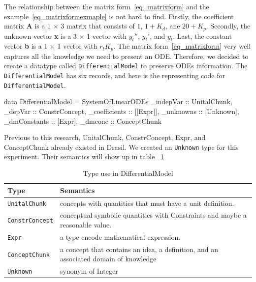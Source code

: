 The relationship between the matrix form~\ref{eq_matrixform} and the example~\ref{eq_matrixformexmaple} is not hard to find. Firstly, the coefficient matrix \textbf{A} is a 1 $\times$ 3 matrix that consists of $1$, $1 + K_d$, ane $20 + K_p$. Secondly, the unknown vector \textbf{x} is a 3 $\times$ 1 vector with $y_t''$, $y_t'$, and $y_t$. Last, the constant vector \textbf{b} is a 1 $\times$ 1 vector with $r_t K_p$. The matrix form~\ref{eq_matrixform} very well captures all the knowledge we need to present an ODE. Therefore, we decided to create a datatype called \verb|DifferentialModel| to preserve ODEs information. The \verb|DifferentialModel| has six records, and here is the representing code for \verb|DifferentialModel|.
\begin{haskell1}
data DifferentialModel = SystemOfLinearODEs {
	_indepVar :: UnitalChunk,
	_depVar :: ConstrConcept,
	_coefficients :: [[Expr]],
	_unknowns :: [Unknown],
	_dmConstants :: [Expr],
	_dmconc :: ConceptChunk
}
\end{haskell1}

Previous to this research, UnitalChunk, ConstrConcept, Expr, and ConceptChunk already existed in Drasil. We created an \verb|Unknown| type for this experiment. Their semantics will show up in table ~\ref{tab_demodeltype}

\begin{table}[ht]
	\begin{tabular}{ p{} p{} }
		\textbf{Type} & \textbf{Semantics} \\
		\toprule
		\verb|UnitalChunk| & concepts with quantities that must have a unit definition.\\
		\verb|ConstrConcept| & conceptual symbolic quantities with Constraints and maybe a reasonable value.\\
		\verb|Expr| & a type encode mathematical expression. \\
		\verb|ConceptChunk| & a concept that contains an idea, a definition, and an associated domain of knowledge\\
        \verb|Unknown|& synonym of Integer\\
		\bottomrule	
	\end{tabular}	
	\caption{Type use in DifferentialModel}	
	\label{tab_demodeltype}
\end{table}

